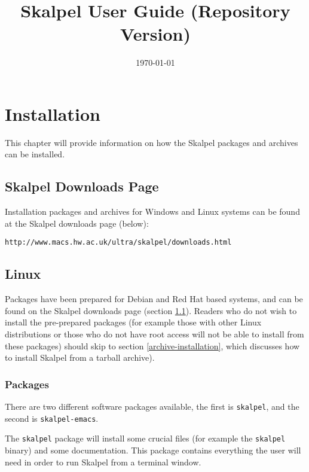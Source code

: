 \documentclass{report}
\title{Skalpel User Guide (Repository Version)}
\date{\today}
\begin{document}
\maketitle
\vspace{110mm}

\newpage

\tableofcontents

\newpage

\chapter {Installation}
\label{skalpel-installation}

This chapter will provide information on how the Skalpel packages and
archives can be installed.

\section {Skalpel Downloads Page}
\label{skalpel-downloads-page}

Installation packages and archives for Windows and Linux systems can
be found at the Skalpel downloads page (below):

\begin{center}\texttt{http://www.macs.hw.ac.uk/ultra/skalpel/downloads.html}\end{center}

\section {Linux}

Packages have been prepared for Debian and Red Hat based systems, and
can be found on the Skalpel downloads page (section
\ref{skalpel-downloads-page}). Readers who do not wish to install the
pre-prepared packages (for example those with other Linux
distributions or those who do not have root access will not be able to
install from these packages) should skip to section
\ref{archive-installation}, which discusses how to install Skalpel
from a tarball archive).

\subsection {Packages}

There are two different software packages available, the first is
\texttt{skalpel}, and the second is \texttt{skalpel-emacs}.

The \texttt{skalpel} package will install some crucial files (for
example the \texttt{skalpel} binary) and some documentation. This
package contains everything the user will need in order to run Skalpel
from a terminal window.
\end{document}
